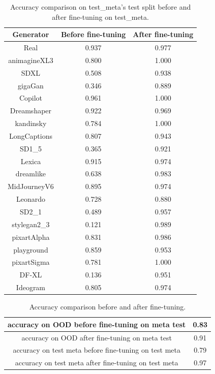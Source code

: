 \documentclass[12pt,a4paper]{article}
\begin{document}
\begin{table}[H]
\centering
    \begin{tabular}{|c|c|c|}
        \hline
        Generator & Before fine-tuning & After fine-tuning\\
        \hline
        Real & 0.937 & 0.977 \\
        \hline
        animagineXL3 & 0.800 & 1.000 \\
        \hline
        SDXL & 0.508 & 0.938 \\
        \hline
        gigaGan & 0.346 & 0.889 \\
        \hline
        Copilot & 0.961 & 1.000 \\
        \hline
        Dreamshaper & 0.922 & 0.969 \\
        \hline
        kandinsky & 0.784 & 1.000 \\
        \hline
        LongCaptions & 0.807 & 0.943 \\
        \hline
        SD1\_5 & 0.365 & 0.921 \\
        \hline
        Lexica & 0.915 & 0.974 \\
        \hline
        dreamlike & 0.638 & 0.983 \\
        \hline
        MidJourneyV6 & 0.895 & 0.974 \\
        \hline
        Leonardo & 0.728 & 0.880 \\
        \hline
        SD2\_1 & 0.489 & 0.957 \\
        \hline
        stylegan2\_3 & 0.121 & 0.989 \\
        \hline
        pixartAlpha & 0.831 & 0.986 \\
        \hline
        playground & 0.859 & 0.953 \\
        \hline
        pixartSigma & 0.781 & 1.000 \\
        \hline
        DF-XL & 0.136 & 0.951 \\
        \hline
        Ideogram & 0.805 & 0.974 \\
        \hline
    \end{tabular}
    \caption{Accuracy comparison on test\_meta's test split before and after fine-tuning on test\_meta.}
\end{table}

\begin{table}[H]
    \centering
    \begin{tabular}{|c|c|}
        \hline
        accuracy on OOD before fine-tuning on meta test & 0.83 \\
        \hline
        accuracy on OOD after fine-tuning on meta test & 0.91 \\
        \hline
        accuracy on test meta before fine-tuning on test meta & 0.79 \\
        \hline
        accuracy on test meta after fine-tuning on test meta & 0.97 \\
        \hline
    \end{tabular}
    \caption{Accuracy comparison before and after fine-tuning.}
    \label{tab:fine-tuning}
\end{table}
\end{document}
